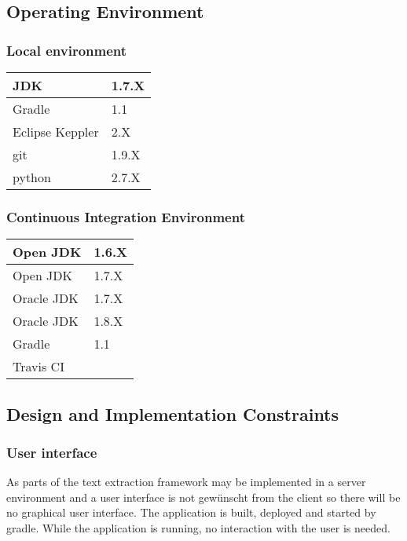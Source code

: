 \subsection{Operating Environment}

\subsubsection{Local environment}

\begin{tabular}{| p{3cm} | p{3cm} |}
	\hline
	JDK & 1.7.X  \\ \hline
	Gradle & 1.1 \\ \hline
	Eclipse Keppler & 2.X \\ \hline
	git & 1.9.X \\ \hline
	python & 2.7.X \\ \hline
\end{tabular}


\subsubsection{Continuous Integration Environment}

\begin{tabular}{| p{3cm} | p{3cm} |}
	\hline
	Open JDK & 1.6.X  \\ \hline
	Open JDK & 1.7.X  \\ \hline
	Oracle JDK & 1.7.X \\ \hline
	Oracle JDK & 1.8.X  \\ \hline
	Gradle & 1.1 \\ \hline
	Travis CI &  \\ \hline
\end{tabular}



\subsection{Design and Implementation Constraints}

\subsubsection{User interface}
As parts of the text extraction framework may be implemented in a server environment and a user interface is not gewünscht from the client so there will be no graphical user interface. The application is built, deployed and started by gradle. While the application is running, no interaction with the user is needed.


